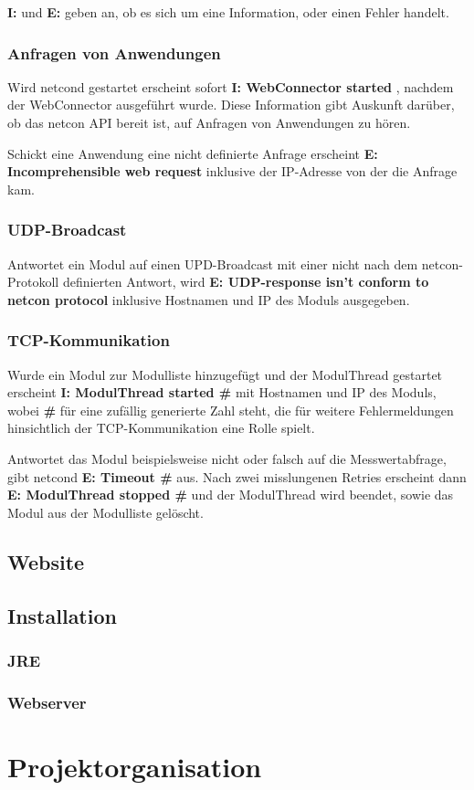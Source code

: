\documentclass[a4paper,14pt,headsepline]{scrartcl}
\begin{document}
\textbf{I:} und \textbf{E:} geben an, ob es sich um eine Information, oder einen Fehler handelt. 

\newpage
\subsubsection*{Anfragen von Anwendungen}

Wird netcond gestartet erscheint sofort \textbf{I: WebConnector started} , nachdem der WebConnector ausgeführt wurde. Diese Information gibt Auskunft darüber, ob das netcon API bereit ist, auf Anfragen von Anwendungen zu hören. 

Schickt eine Anwendung eine nicht definierte Anfrage erscheint \textbf{E: Incomprehensible web request} inklusive der IP-Adresse von der die Anfrage kam.

\subsubsection*{UDP-Broadcast}
Antwortet ein Modul auf einen UPD-Broadcast mit einer nicht nach dem netcon-Protokoll definierten Antwort, wird  \textbf{E: UDP-response isn’t conform to netcon protocol} inklusive Hostnamen und IP des Moduls ausgegeben.

\subsubsection*{TCP-Kommunikation}
Wurde ein Modul zur Modulliste hinzugefügt und der ModulThread gestartet erscheint \textbf{I: ModulThread started \#} mit Hostnamen und IP des Moduls, wobei \textbf{\#} für eine zufällig generierte Zahl steht, die für weitere Fehlermeldungen hinsichtlich der TCP-Kommunikation eine Rolle spielt. 

Antwortet das Modul beispielsweise nicht oder falsch auf die Messwertabfrage, gibt netcond \textbf{E: Timeout \#} aus. Nach zwei misslungenen Retries erscheint dann \textbf{E: ModulThread stopped \#} und der ModulThread wird beendet, sowie das Modul aus der Modulliste gelöscht. 


\newpage


\newpage

\subsection{Website}

\newpage

\subsection{Installation}

\subsubsection{JRE}

\subsubsection{Webserver}

\newpage

\section{Projektorganisation}

 
\end{document}
